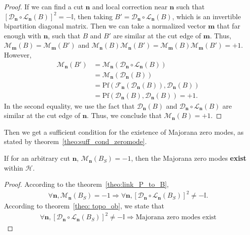 \begin{proof}
    If we can find a cut $\mathbf{n}$ and local correction near $\mathbf{n}$ such that $[\mathcal{D}_{\mathbf{n}}\circ \mathcal{L}_{\mathbf n}(B)]^2 = - \mathbb{I}$, then taking $B' = \mathcal{D}_{\mathbf{n}}\circ \mathcal{L}_{\mathbf n}(B)$, which is an invertible bipartition diagonal matrix. Then we can take a  normalized vector $\mathbf{m}$ that far enough with $\mathbf{n}$, such that $B$ and $B'$ are similar at the cut edge of $\mathbf{m}$. Thus,  $\mathcal{M}_{\mathbf{m}}(B)= \mathcal{M}_{\mathbf{m}}(B')$ and $\mathcal{M}_{\mathbf{n}}(B) \mathcal{M}_{\mathbf{n}}(B') = \mathcal{M}_{\mathbf{m}}(B) \mathcal{M}_{\mathbf{m}}(B') = +1$.
    However,
    \begin{align}
        \mathcal{M}_{\mathbf{n}}(B') &=\mathcal{M}_{\mathbf{n}}(\mathcal{D}_{\mathbf{n}}\circ \mathcal{L}_{\mathbf{n}}(B)) \\
        &= \mathcal{M}_{\mathbf{n}}(\mathcal{D}_{\mathbf{n}}(B)) \\&= \text{Pf}(\mathcal{F}_{\mathbf n}(\mathcal{D}_{\mathbf{n}}(B)),\mathcal{D}_{\mathbf{n}}(B)) \\
        &= \text{Pf}(\mathcal{D}_{\mathbf{n}}(B),\mathcal{D}_{\mathbf{n}}(B)) = +1.
    \end{align}
    In the second equality, we use the fact that $\mathcal{D}_{\mathbf{n}}(B)$ and $\mathcal{D}_{\mathbf{n}}\circ \mathcal{L}_{\mathbf{n}}(B)$ are similar at the cut edge of $\mathbf{n}$. Thus, we conclude that $\mathcal{M}_{\mathbf{n}}(B) = +1$.
\end{proof}
Then we get a sufficient condition for the existence of Majorana zero modes, as stated by theorem~\ref{theo:suff_cond_zeromode}.
\begin{theorem}\label{theo:suff_cond_zeromode}
    If for an arbitrary cut $\mathbf{n}$, $\mathcal{M}_{\mathbf{n}}(B_S) = -1$, then the Majorana zero modes\textbf{ exist} within $\mathcal{H}$.
\end{theorem}
\begin{proof}
    According to the theorem~\ref{theo:link_P_to_B}, 
    \begin{align}
        \forall \mathbf{n},\mathcal{M}_{\mathbf{n}}(B_S) = -1 \Rightarrow \forall \mathbf{n},[\mathcal{D}_{\mathbf{n}}\circ \mathcal{L}_{\mathbf n}(B_S)]^2 \neq  - \mathbb{I}.
    \end{align}    According to theorem~\ref{theo: topo_ob}, we state that
    \begin{align}
        \forall \mathbf{n},[\mathcal{D}_{\mathbf{n}}\circ \mathcal{L}_{\mathbf n}(B_S)]^2 \neq  - \mathbb{I} \Rightarrow \text{Majorana zero modes exist}
    \end{align}
\end{proof}
